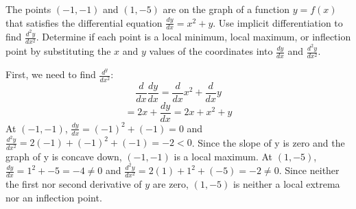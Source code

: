 \begin{Exercise} The points 
	$(-1, -1)$ and $(1, -5)$ are on the graph of a function $y = f(x)$ 
	that satisfies the differential equation $\frac{dy}{dx} = x^2 + y$. 
	Use implicit differentiation to find $\frac{d^2y}{dx^2}$. Determine 
	if each point is a local minimum, local maximum, or inflection point 
	by substituting the $x$ and $y$ values of the coordinates into 
	$\frac{dy}{dx}$ and $\frac{d^2y}{dx^2}$. 
\end{Exercise}

\begin{Answer}[ref=implicit2]
	First, we need to find $\frac{d^y}{dx^2}$:
	$$\frac{d}{dx}\frac{dy}{dx} = \frac{d}{dx}x^2 + \frac{d}{dx}y$$
	$$= 2x + \frac{dy}{dx} = 2x + x^2 + y$$
	At $(-1,-1)$, $\frac{dy}{dx} = (-1)^2 + (-1) = 0$ and 
	$\frac{d^2y}{dx^2} = 2(-1) + (-1)^2 + (-1) = -2 < 0$. Since the 
	slope of y is zero and the graph of y is concave down, $(-1,-1)$ is a 
	local maximum. At $(1, -5)$, $\frac{dy}{dx} = 1^2 + -5 = -4 \neq 0$ 
	and $\frac{d^2y}{dx^2} = 2(1) + 1^2 + (-5) = -2 \neq 0$. Since 
	neither the first nor second derivative of $y$ are zero, $(1, -5)$ 
	is neither a local extrema nor an inflection point. 
\end{Answer}


